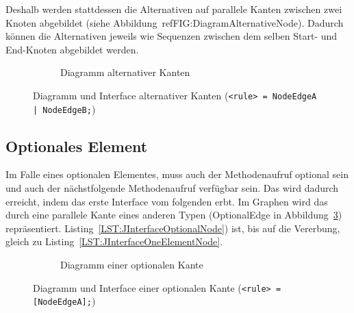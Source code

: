 \documentclass[../InterneDSLs.tex]{subfiles}
\begin{document}
Deshalb werden stattdessen die Alternativen auf parallele Kanten zwischen zwei Knoten abgebildet (siehe Abbildung~ref{FIG:DiagramAlternativeNode}). Dadurch können die Alternativen jeweils wie Sequenzen zwischen dem selben Start- und End-Knoten abgebildet werden.
\begin{figure}[ht]
\centering
  \begin{subfigure}[c]{0.49\textwidth}
    \caption{Diagramm alternativer Kanten}
    \label{FIG:DiagramAlternativeNode}
  \end{subfigure}
  \begin{subfigure}[c]{0.49\textwidth}
    
  \end{subfigure}
  \caption{Diagramm und Interface alternativer Kanten (\texttt{<rule> = NodeEdgeA | NodeEdgeB;})}
  \label{FIG:AlternativeNode}
\end{figure}

\subsection{Optionales Element}\label{SEC:Optional}
Im Falle eines optionalen Elementes, muss auch der Methodenaufruf optional sein und auch der nächstfolgende Methodenaufruf verfügbar sein. Das wird dadurch erreicht, indem das erste Interface vom folgenden erbt. Im Graphen wird das durch eine parallele Kante eines anderen Typen (OptionalEdge in Abbildung~\ref{FIG:DiagramOptionalNode}) repräsentiert. Listing~\ref{LST:JInterfaceOptionalNode}) ist, bis auf die Vererbung, gleich zu Listing~\ref{LST:JInterfaceOneElementNode}.
\begin{figure}[ht]
\centering
  \begin{subfigure}[c]{0.49\textwidth}
    \caption{Diagramm einer optionalen Kante}
    \label{FIG:DiagramOptionalNode}
  \end{subfigure}
  \begin{subfigure}[c]{0.49\textwidth}
    
  \end{subfigure}
  \caption{Diagramm und Interface einer optionalen Kante (\texttt{<rule> = [NodeEdgeA];})}
  \label{FIG:OptionalNode}
\end{figure}
\end{document}
